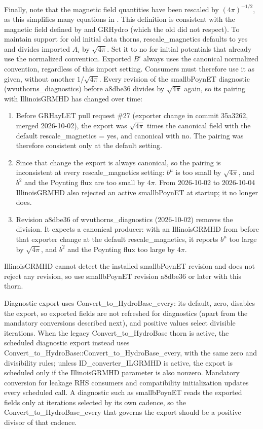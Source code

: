 \documentclass{article}
\begin{document}
Finally, note that the magnetic field quantities have been rescaled by
$\left(4\pi\right)^{-1/2}$, as this simplifies many equations in \grhayl.
This definition is consistent with the magnetic field defined by \hydrobase{}
and GRHydro (which the old \igm{} did not respect). To maintain support for
old initial data thorns, rescale\_magnetics defaults to yes and divides
imported \hydrobase{} $A_i$ by $\sqrt{4\pi}$. Set it to no for initial
potentials that already use the normalized convention. Exported
\hydrobase{} $B^i$ always uses the canonical normalized convention, regardless
of this import setting. Consumers must therefore use it as given, without
another $1/\sqrt{4\pi}$. Every revision of the smallbPoynET diagnostic
(wvuthorns\_diagnostics) before a8dbe36 divides by $\sqrt{4\pi}$ again, so its
pairing with IllinoisGRMHD has changed over time:
\begin{enumerate}
\item Before GRHayLET pull request \#27 (exporter change in commit 35a3262,
  merged 2026-10-02), the export was $\sqrt{4\pi}$ times the canonical field
  with the default rescale\_magnetics = yes, and canonical with no. The
  pairing was therefore consistent only at the default setting.
\item Since that change the export is always canonical, so the pairing is
  inconsistent at every rescale\_magnetics setting: $b^\mu$ is too small by
  $\sqrt{4\pi}$, and $b^2$ and the Poynting flux are too small by $4\pi$.
  From 2026-10-02 to 2026-10-04 IllinoisGRMHD also rejected an active
  smallbPoynET at startup; it no longer does.
\item Revision a8dbe36 of wvuthorns\_diagnostics (2026-10-02) removes the
  division. It expects a canonical producer: with an IllinoisGRMHD from before
  that exporter change at the default rescale\_magnetics, it reports $b^\mu$
  too large by $\sqrt{4\pi}$, and $b^2$ and the Poynting flux too large by
  $4\pi$.
\end{enumerate}
IllinoisGRMHD cannot detect the installed smallbPoynET revision and does not
reject any revision, so use smallbPoynET revision a8dbe36 or later with this
thorn.

Diagnostic export uses Convert\_to\_HydroBase\_every: its default, zero,
disables the export, so exported fields are not refreshed for diagnostics
(apart from the mandatory conversions described next), and positive values
select divisible iterations. When the legacy Convert\_to\_HydroBase thorn is
active, the scheduled diagnostic export instead uses
Convert\_to\_HydroBase::Convert\_to\_HydroBase\_every, with the same zero and
divisibility rules; unless ID\_converter\_ILGRMHD is active, the export is
scheduled only if the IllinoisGRMHD parameter is also nonzero. Mandatory
conversion for leakage RHS consumers and
compatibility initialization updates every scheduled call. A diagnostic such
as smallbPoynET reads the exported fields only at iterations selected by its
own cadence, so the Convert\_to\_HydroBase\_every that governs the export
should be a positive divisor of that cadence.
\end{document}
